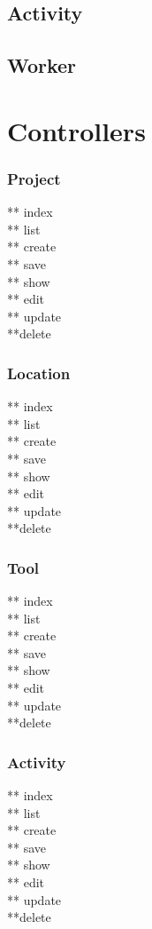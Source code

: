\documentclass[12pt]{article}
\begin{document}
\subsection{Activity}
\subsection{Worker}

\section{Controllers}\label{sec:Controllers}

\subsubsection{Project}
** index\\
** list\\
** create\\
** save\\
** show\\
** edit\\
** update\\
**delete\\

\subsubsection{Location}
** index\\
** list\\
** create\\
** save\\
** show\\
** edit\\
** update\\
**delete\\

\subsubsection{Tool}
** index\\
** list\\
** create\\
** save\\
** show\\
** edit\\
** update\\
**delete\\

\subsubsection{Activity}
** index\\
** list\\
** create\\
** save\\
** show\\
** edit\\
** update\\
**delete\\
\end{document}
